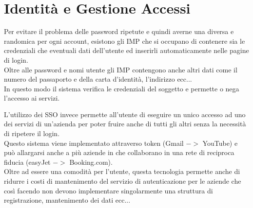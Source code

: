 \section{Identità e Gestione Accessi}
\label{sec:identityaccessmanagement}
Per evitare il problema delle password ripetute e quindi averne una diversa e randomica per ogni account, esistono gli \acrfull{IMP} che si occupano di contenere sia le credenziali che eventuali dati dell'utente ed inserirli automaticamente nelle pagine di login.\\
Oltre alle password e nomi utente gli \acrshort{IMP} contengono anche altri dati come il numero del passaporto e della carta d'identità, l'indirizzo ecc...\\
In questo modo il sistema verifica le credenziali del soggetto e permette o nega l'accesso ai servizi.

L'utilizzo dei \acrfull{SSO} invece permette all'utente di eseguire un unico accesso ad uno dei servizi di un'azienda per poter fruire anche di tutti gli altri senza la necessità di ripetere il login.\\
Questo sistema viene implementato attraverso token (Gmail $->$ YouTube) e può allargarsi anche a più aziende in che collaborano in una rete di reciproca fiducia (easyJet $->$ Booking.com).\\
Oltre ad essere una comodità per l'utente, questa tecnologia permette anche di ridurre i costi di mantenimento del servizio di autenticazione per le aziende che così facendo non devono implementare singolarmente una struttura di registrazione, mantenimento dei dati ecc...\\

